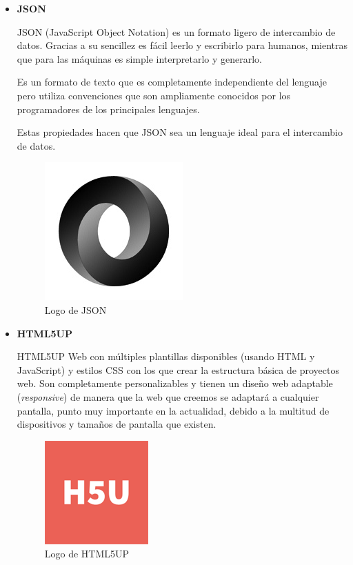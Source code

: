 \begin{itemize}
	\item \textbf{JSON}
		
	JSON (JavaScript Object Notation) \cite{json} es un formato ligero de intercambio de datos. Gracias a su sencillez es fácil leerlo y escribirlo para humanos, mientras que para las máquinas es simple interpretarlo y generarlo.
	
	Es un formato de texto que es completamente independiente del lenguaje pero utiliza convenciones que son ampliamente conocidos por los programadores de los principales lenguajes. 
	
	Estas propiedades hacen que JSON sea un lenguaje ideal para el intercambio de datos.

	\bigskip
	\begin{figure}[h]
		\centering
		\includegraphics[width=0.3\linewidth]{../images/jsonlogo}
		\caption[Logo de JSON]{Logo de JSON}
		\label{fig:jsonlogo}
	\end{figure}
	
	\item \textbf{HTML5UP}
		
	HTML5UP \cite{htmlup} Web con múltiples plantillas disponibles (usando HTML y JavaScript) y estilos CSS con los que crear la estructura básica de proyectos web. Son completamente personalizables y	tienen un diseño web adaptable (\textit{responsive}) de manera que la web que creemos se adaptará a cualquier pantalla, punto muy importante en la actualidad, debido a la multitud de dispositivos y tamaños de pantalla que existen.

	\bigskip
	\begin{figure}[h]
		\centering
		\includegraphics[width=0.3\linewidth]{../images/htmluplogo}
		\caption[Logo de HTML5UP]{Logo de HTML5UP}
		\label{fig:htmluplogo}
	\end{figure}
		
\end{itemize}
	
